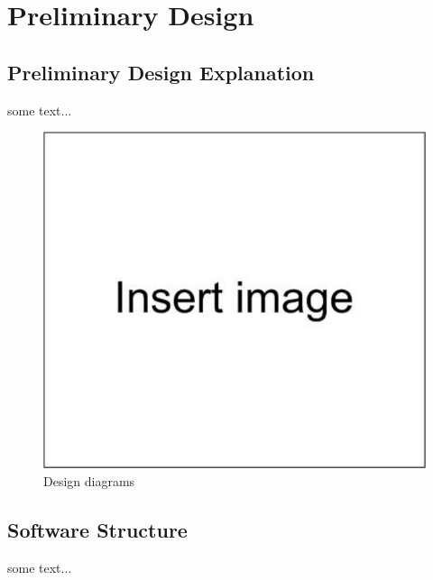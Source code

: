\section{Preliminary Design}
\label{sec:preliminary_design}

\subsection{Preliminary Design Explanation}

some text...

\begin{figure}[bht]
\centering
\includegraphics[scale=0.5]{figures/Drawing1}
\caption{Design diagrams}
\label{fig:some_reference}
\end{figure}

\subsection{Software Structure}

some text...

